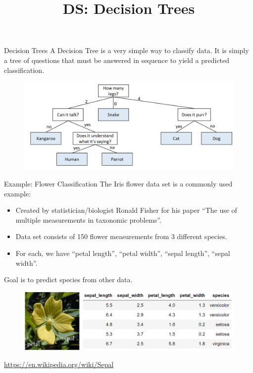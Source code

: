 \documentclass[aspectratio=169]{../latex_main/tntbeamer}  %
\title[Introduction]{DS: Decision Trees}
\subtitle{}
\begin{document}
	
	\maketitle
	\begin{frame}{Decision Trees}
	    A Decision Tree is a very simple way to classify data. It is simply a tree of questions that must be answered in sequence to yield a predicted classification.
	    \begin{figure}
	        \centering
	        \includegraphics[scale=.35]{Bild1}
	    \end{figure}
	\end{frame}
	
	
	\begin{frame}{Example: Flower Classification}
	    The Iris flower data set is a commonly used example:
	    \begin{itemize}
	        \item Created by statistician/biologist Ronald Fisher for his paper “The use of multiple measurements in taxonomic problems”.
	        \item Data set consists of 150 flower measurements from 3 different species.
	        \item For each, we have “petal length”, “petal width”, “sepal length”, “sepal width”.
	    \end{itemize}
	    Goal is to predict species from other data.
	    \begin{figure}
	        \centering
	        \includegraphics[scale=.35]{Bild2}
	    \end{figure}
	    \url{https://en.wikipedia.org/wiki/Sepal}

	\end{frame}
\end{document}
